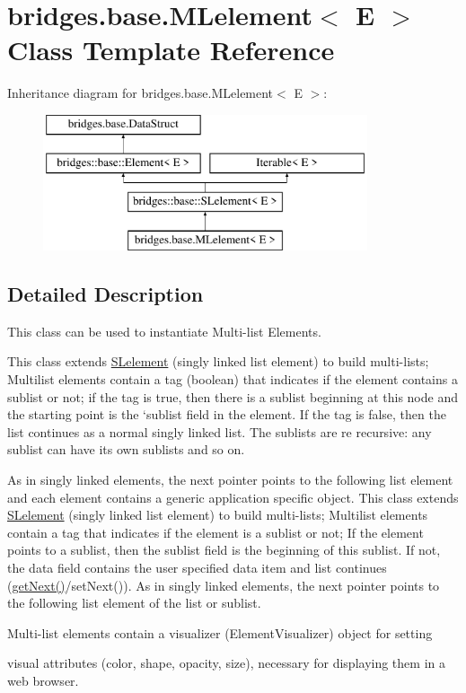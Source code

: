 \hypertarget{classbridges_1_1base_1_1_m_lelement}{}\section{bridges.\+base.\+M\+Lelement$<$ E $>$ Class Template Reference}
\label{classbridges_1_1base_1_1_m_lelement}
Inheritance diagram for bridges.\+base.\+M\+Lelement$<$ E $>$\+:\begin{figure}[H]
\begin{center}
\leavevmode
\includegraphics[height=4.000000cm]{classbridges_1_1base_1_1_m_lelement}
\end{center}
\end{figure}


\subsection{Detailed Description}
This class can be used to instantiate Multi-\/list Elements. 

This class extends \hyperlink{classbridges_1_1base_1_1_s_lelement}{S\+Lelement} (singly linked list element) to build multi-\/lists; Multilist elements contain a tag (boolean) that indicates if the element contains a sublist or not; if the tag is true, then there is a sublist beginning at this node and the starting point is the `sublist\textquotesingle{} field in the element. If the tag is false, then the list continues as a normal singly linked list. The sublists are re recursive\+: any sublist can have its own sublists and so on.

As in singly linked elements, the next pointer points to the following list element and each element contains a generic application specific object. This class extends \hyperlink{classbridges_1_1base_1_1_s_lelement}{S\+Lelement} (singly linked list element) to build multi-\/lists; Multilist elements contain a tag that indicates if the element is a sublist or not; If the element points to a sublist, then the sublist field is the beginning of this sublist. If not, the data field contains the user specified data item and list continues (\hyperlink{classbridges_1_1base_1_1_m_lelement_a52ddc26a69eccda5f5b57b94cf87a545}{get\+Next()}/set\+Next()). As in singly linked elements, the next pointer points to the following list element of the list or sublist. \begin{DoxyVerb}Multi-list elements contain a visualizer (ElementVisualizer) object for setting
\end{DoxyVerb}
 visual attributes (color, shape, opacity, size), necessary for displaying them in a web browser.

